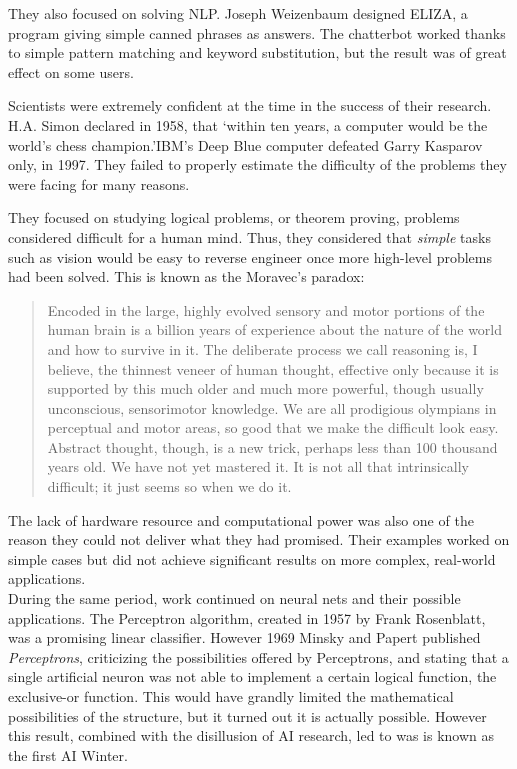 \documentclass[12pt]{article}
\begin{document}
\smallskip

They also focused on solving \gls{NLP}. Joseph Weizenbaum designed ELIZA, a
program giving simple canned phrases as answers. The chatterbot worked thanks to
simple  pattern matching and keyword substitution, but the result was of great
effect on some users.

Scientists were extremely confident at the time in the success of their research.
H.A. Simon declared in 1958, that \lq within ten years, a computer would be the
world's chess champion.\rq IBM's Deep Blue computer defeated Garry Kasparov only,
in 1997. They failed to properly estimate the difficulty of the problems they were
facing for many reasons.

They focused on studying logical problems, or theorem proving, problems considered
difficult for a human mind. Thus, they considered that {\em simple} tasks such as
vision would be easy to reverse engineer once more high-level problems had been
solved. This is known as the Moravec's paradox:

\begin{quotation}
  Encoded in the large, highly evolved sensory and motor portions of the human
  brain is a billion years of experience about the nature of the world and how
  to survive in it. The deliberate process we call reasoning is, I believe, the
  thinnest veneer of human thought, effective only because it is supported by
  this much older and much more powerful, though usually unconscious,
  sensorimotor knowledge. We are all prodigious olympians in perceptual and
  motor areas, so good that we make the difficult look easy. Abstract thought,
  though, is a new trick, perhaps less than 100 thousand years old. We have not
  yet mastered it. It is not all that intrinsically difficult; it just seems so
  when we do it. \cite{Moravec}
\end{quotation}

The lack of hardware resource and computational power was also one of the reason
they could not deliver what they had promised. Their examples worked on simple
cases but did not achieve significant results on more complex, real-world
applications.\\

During the same period, work continued on neural nets and their possible
applications. The Perceptron algorithm, created in 1957 by Frank Rosenblatt, was
a promising linear classifier. However 1969 Minsky and Papert published {\em
Perceptrons}, criticizing the possibilities offered by Perceptrons, and stating
that a single artificial neuron was not able to implement a certain logical
function, the exclusive-or function. This would have grandly limited the mathematical
possibilities of the structure, but it turned out it is actually possible. However
this result, combined with the disillusion of AI research, led to was is known as
the first AI Winter.
\end{document}

